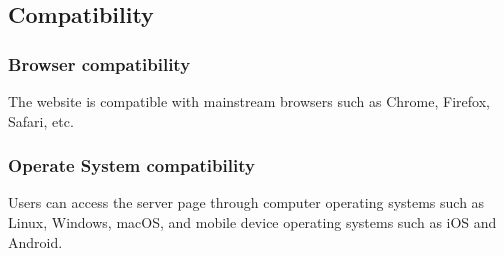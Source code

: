 \documentclass[conference]{IEEEtran}
\begin{document}
\subsection{ Compatibility }


\subsubsection{ Browser compatibility }


The website is compatible with mainstream browsers such as Chrome, 
Firefox, Safari, etc.

\subsubsection{ Operate System compatibility }

Users can access the server page through computer operating systems 
such as Linux, Windows, macOS, and mobile device operating systems such 
as iOS and Android.
\end{document}
